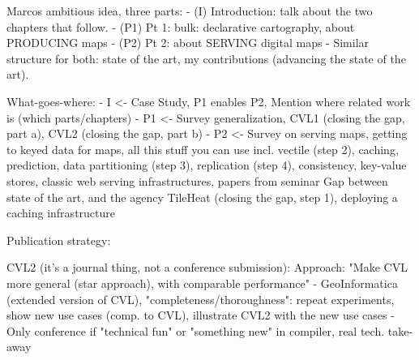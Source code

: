 \documentclass[11pt, oneside]{report}   	%
\begin{document}





Marcos ambitious idea, three parts:
- (I) Introduction: talk about the two chapters that follow. 
- (P1) Pt 1: bulk: declarative cartography, about PRODUCING maps
- (P2) Pt 2: about SERVING digital maps
- Similar structure for both: state of the art, my contributions (advancing the state of the art).  

What-goes-where:
- I <- Case Study, P1 enables P2, Mention where related work is (which parts/chapters)
- P1 <- 
        Survey generalization, 
        CVL1 (closing the gap, part a), 
        CVL2 (closing the gap, part b)
- P2 <- 
        Survey on serving maps, getting to keyed data for maps, all this stuff you can use 
                incl. vectile (step 2),
                caching,
                prediction,
                data partitioning (step 3), 
                replication (step 4), 
                consistency, 
                key-value stores, 
                classic web serving infrastructures,
                papers from seminar
        Gap between state of the art, and the agency
        TileHeat (closing the gap, step 1), deploying a caching infrastructure
        
Publication strategy:

CVL2 (it's a journal thing, not a conference submission):
Approach: "Make CVL more general (star approach), with comparable performance"
- GeoInformatica (extended version of CVL), "completeness/thoroughness": repeat experiments, show new use cases (comp. to CVL), illustrate CVL2 with the new use cases 
- Only conference if "technical fun" or "something new" in compiler, real tech. take-away
\end{document}
